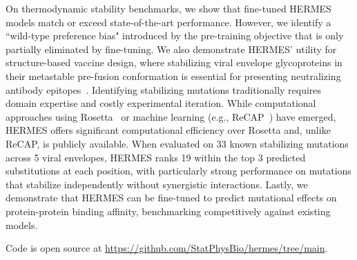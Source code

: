 On thermodynamic stability benchmarks, we show that fine-tuned HERMES models match or exceed
state-of-the-art performance. However, we identify a ``wild-type preference bias" introduced by the
pre-training objective that is only partially eliminated by fine-tuning. We also demonstrate HERMES'
utility for structure-based vaccine design, where stabilizing viral envelope glycoproteins in their
metastable pre-fusion conformation is essential for presenting neutralizing antibody
epitopes~\citep{mclellan_structure-based_2013}. Identifying stabilizing mutations traditionally
requires domain expertise and costly experimental iteration. While computational approaches using
Rosetta~\citep{gonzalez_general_2024, phan_conserved_2022} or machine learning (e.g.,
ReCAP~\citep{bakkers_efficacious_2024}) have emerged, HERMES offers significant computational
efficiency over Rosetta and, unlike ReCAP, is publicly available.
When evaluated on 33 known
stabilizing mutations across 5 viral envelopes, HERMES ranks 19 within the top 3 predicted
substitutions at each position, with particularly strong performance on mutations that stabilize
independently without synergistic interactions.
Lastly, we demonstrate that HERMES can be fine-tuned
to predict mutational effects on protein-protein binding affinity, benchmarking competitively
against existing models.

Code is open source at \url{https://github.com/StatPhysBio/hermes/tree/main}.





